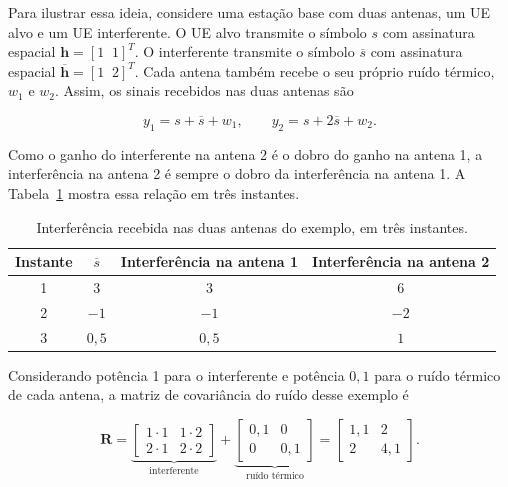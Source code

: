 
Para ilustrar essa ideia, considere uma estação base com duas antenas, um UE alvo e um UE interferente. O UE alvo transmite o símbolo $s$ com assinatura espacial $\mathbf{h}=[1\;\;1]^T$. O interferente transmite o símbolo $\overline{s}$ com assinatura espacial $\overline{\mathbf{h}}=[1\;\;2]^T$. Cada antena também recebe o seu próprio ruído térmico, $w_1$ e $w_2$. Assim, os sinais recebidos nas duas antenas são

$$
y_1 = s + \overline{s} + w_1, \qquad y_2 = s + 2\overline{s} + w_2.
$$

Como o ganho do interferente na antena 2 é o dobro do ganho na antena 1, a interferência na antena 2 é sempre o dobro da interferência na antena 1. A Tabela~\ref{tab:interferencia_duas_antenas} mostra essa relação em três instantes.

\begin{table}[htbp]
\caption{Interferência recebida nas duas antenas do exemplo, em três instantes.}
\label{tab:interferencia_duas_antenas}
\centering
\begin{tabular}{cccc}
\hline
Instante & $\overline{s}$ & Interferência na antena 1 & Interferência na antena 2 \\
\hline
1 & $3$ & $3$ & $6$ \\
2 & $-1$ & $-1$ & $-2$ \\
3 & $0{,}5$ & $0{,}5$ & $1$ \\
\hline
\end{tabular}
\end{table}

Considerando potência 1 para o interferente e potência $0{,}1$ para o ruído térmico de cada antena, a matriz de covariância do ruído desse exemplo é

$$
\mathbf{R}=
\underbrace{\begin{bmatrix} 1\cdot 1 & 1\cdot 2 \\ 2\cdot 1 & 2\cdot 2 \end{bmatrix}}_{\text{interferente}}
+
\underbrace{\begin{bmatrix} 0{,}1 & 0 \\ 0 & 0{,}1 \end{bmatrix}}_{\text{ruído térmico}}
=
\begin{bmatrix} 1{,}1 & 2 \\ 2 & 4{,}1 \end{bmatrix}.
$$

